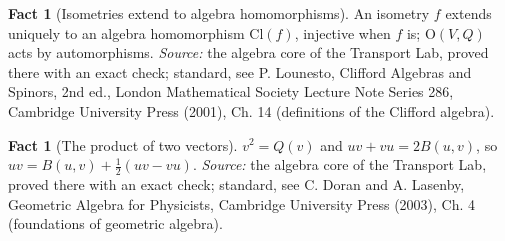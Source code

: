 \documentclass[11pt]{article}
\theoremstyle{definition}
\newtheorem{fact}[theorem]{Fact}
\theoremstyle{plain}
\providecommand{\Cl}{}\renewcommand{\Cl}{\mathrm{Cl}}
\begin{document}
\begin{fact}[Isometries extend to algebra homomorphisms]\label{c:std-algebra.functoriality}
An isometry $f$ extends uniquely to an algebra homomorphism $\Cl(f)$, injective when $f$ is; $\mathrm{O}(V, Q)$ acts by automorphisms.
\emph{Source:} the algebra core of the Transport Lab, proved there with an exact check; standard, see P. Lounesto, Clifford Algebras and Spinors, 2nd ed., London Mathematical Society Lecture Note Series 286, Cambridge University Press (2001), Ch. 14 (definitions of the Clifford algebra).
\end{fact}

\begin{fact}[The product of two vectors]\label{c:std-algebra.vector-squares}
$v^{2} = Q(v)$ and $uv + vu = 2B(u, v)$, so $uv = B(u, v) + \tfrac12(uv - vu)$.
\emph{Source:} the algebra core of the Transport Lab, proved there with an exact check; standard, see C. Doran and A. Lasenby, Geometric Algebra for Physicists, Cambridge University Press (2003), Ch. 4 (foundations of geometric algebra).
\end{fact}
\end{document}
